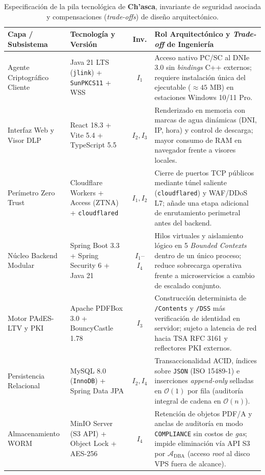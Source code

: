 \documentclass[runningheads,twocolumn]{llncs}
\begin{document}
\begin{table}[t]
\caption{Especificación de la pila tecnológica de \textbf{Ch'asca}, invariante de seguridad asociada y compensaciones (\textit{trade-offs}) de diseño arquitectónico.}
\label{tab:tech_stack}
\scriptsize
\setlength{\tabcolsep}{3.5pt}
\renewcommand{\arraystretch}{1.12}
\begin{tabularx}{\textwidth}{@{}>{\raggedright\arraybackslash}p{3.0cm}>{\raggedright\arraybackslash}p{3.4cm}c>{\raggedright\arraybackslash}X@{}}
\toprule
\textbf{Capa / Subsistema} & \textbf{Tecnología y Versión} & \textbf{Inv.} & \textbf{Rol Arquitectónico y \textit{Trade-off} de Ingeniería} \\
\midrule
Agente Criptográfico Cliente & Java 21 LTS (\texttt{jlink}) + \texttt{SunPKCS11} + WSS & $I_1$ & Acceso nativo PC/SC al DNIe 3.0 sin \textit{bindings} C++ externos; requiere instalación única del ejecutable ($\approx 45$ MB) en estaciones Windows 10/11 Pro. \\
Interfaz Web y Visor DLP & React 18.3 + Vite 5.4 + TypeScript 5.5 & $I_2, I_3$ & Renderizado en memoria con marcas de agua dinámicas (DNI, IP, hora) y control de descarga; mayor consumo de RAM en navegador frente a visores locales. \\
Perímetro Zero Trust & Cloudflare Workers + Access (ZTNA) + \texttt{cloudflared} & $I_1, I_2$ & Cierre de puertos TCP públicos mediante túnel saliente (\texttt{cloudflared}) y WAF/DDoS L7; añade una etapa adicional de enrutamiento perimetral antes del backend. \\
Núcleo Backend Modular & Spring Boot 3.3 + Spring Security 6 + Java 21 & $I_1$--$I_4$ & Hilos virtuales y aislamiento lógico en 5 \textit{Bounded Contexts} dentro de un único proceso; reduce sobrecarga operativa frente a microservicios a cambio de escalado conjunto. \\
Motor PAdES-LTV y PKI & Apache PDFBox 3.0 + BouncyCastle 1.78 & $I_3$ & Construcción determinista de \texttt{/Contents} y \texttt{/DSS} más verificación de identidad en servidor; sujeto a latencia de red hacia TSA RFC 3161 y reflectores PKI externos. \\
Persistencia Relacional & MySQL 8.0 (\texttt{InnoDB}) + Spring Data JPA & $I_2, I_4$ & Transaccionalidad ACID, índices sobre \texttt{JSON} (ISO 15489-1) e inserciones \textit{append-only} selladas en $\mathcal{O}(1)$ por fila (auditoría integral de cadena en $\mathcal{O}(n)$). \\
Almacenamiento WORM & MinIO Server (S3 API) + Object Lock + AES-256 & $I_4$ & Retención de objetos PDF/A y anclas de auditoría en modo \texttt{COMPLIANCE} sin costos de \textit{gas}; impide eliminación vía API S3 por $\mathcal{A}_{\text{DBA}}$ (acceso \textit{root} al disco VPS fuera de alcance). \\
\bottomrule
\end{tabularx}
\end{table}
\end{document}
